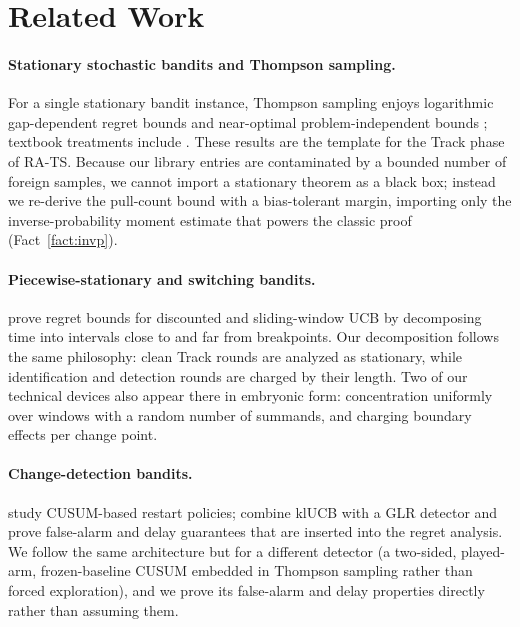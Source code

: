 \documentclass[11pt]{article}
\begin{document}
\section{Related Work}

\paragraph{Stationary stochastic bandits and Thompson sampling.}
For a single stationary bandit instance, Thompson sampling enjoys logarithmic gap-dependent regret bounds and near-optimal problem-independent bounds \citep{AgrawalGoyal2013,KaufmannKordaMunos2012}; textbook treatments include \citet{LattimoreSzepesvari2020}. These results are the template for the Track phase of RA-TS. Because our library entries are contaminated by a bounded number of foreign samples, we cannot import a stationary theorem as a black box; instead we re-derive the pull-count bound with a bias-tolerant margin, importing only the inverse-probability moment estimate that powers the classic proof (Fact~\ref{fact:invp}).

\paragraph{Piecewise-stationary and switching bandits.}
\citet{GarivierMoulines2011} prove regret bounds for discounted and sliding-window UCB by decomposing time into intervals close to and far from breakpoints. Our decomposition follows the same philosophy: clean Track rounds are analyzed as stationary, while identification and detection rounds are charged by their length. Two of our technical devices also appear there in embryonic form: concentration uniformly over windows with a random number of summands, and charging boundary effects per change point.

\paragraph{Change-detection bandits.}
\citet{LiuLeeShroff2018} study CUSUM-based restart policies; \citet{BessonKaufmannMaillardSeznec2022} combine klUCB with a GLR detector and prove false-alarm and delay guarantees that are inserted into the regret analysis. We follow the same architecture but for a different detector (a two-sided, played-arm, frozen-baseline CUSUM embedded in Thompson sampling rather than forced exploration), and we prove its false-alarm and delay properties directly rather than assuming them.
\end{document}
